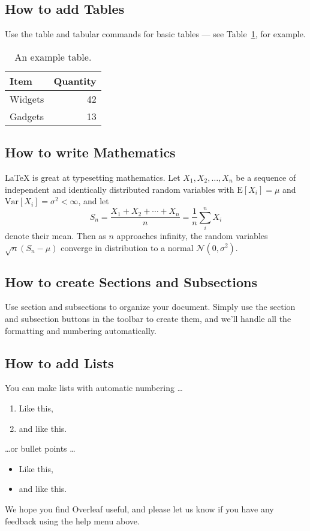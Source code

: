 \documentclass[a4paper]{article}
\begin{document}
\subsection{How to add Tables}

Use the table and tabular commands for basic tables --- see Table~\ref{tab:widgets}, for example. 

\begin{table}
\centering
\begin{tabular}{l|r}
Item & Quantity \\\hline
Widgets & 42 \\
Gadgets & 13
\end{tabular}
\caption{\label{tab:widgets}An example table.}
\end{table}

\subsection{How to write Mathematics}

\LaTeX{} is great at typesetting mathematics. Let $X_1, X_2, \ldots, X_n$ be a sequence of independent and identically distributed random variables with $\text{E}[X_i] = \mu$ and $\text{Var}[X_i] = \sigma^2 < \infty$, and let
\[S_n = \frac{X_1 + X_2 + \cdots + X_n}{n}
      = \frac{1}{n}\sum_{i}^{n} X_i\]
denote their mean. Then as $n$ approaches infinity, the random variables $\sqrt{n}(S_n - \mu)$ converge in distribution to a normal $\mathcal{N}(0, \sigma^2)$.


\subsection{How to create Sections and Subsections}

Use section and subsections to organize your document. Simply use the section and subsection buttons in the toolbar to create them, and we'll handle all the formatting and numbering automatically.

\subsection{How to add Lists}

You can make lists with automatic numbering \dots

\begin{enumerate}
\item Like this,
\item and like this.
\end{enumerate}
\dots or bullet points \dots
\begin{itemize}
\item Like this,
\item and like this.
\end{itemize}

We hope you find Overleaf useful, and please let us know if you have any feedback using the help menu above.
\end{document}
